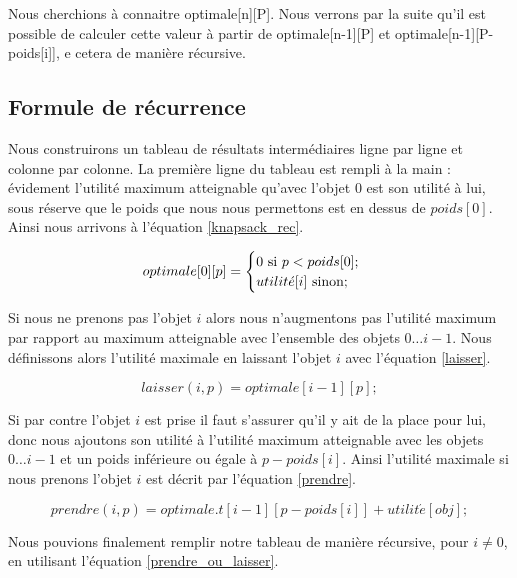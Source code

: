 Nous cherchions à connaitre optimale[n][P]. Nous verrons par la suite qu'il est possible de calculer cette valeur à partir de optimale[n-1][P] et optimale[n-1][P-poids[i]], e cetera de manière récursive.

\subsection{Formule de récurrence}
Nous construirons un tableau de résultats intermédiaires ligne par ligne et colonne par colonne. La première ligne du tableau est rempli à la main : évidement l'utilité maximum atteignable qu'avec l'objet $0$ est son utilité à lui, sous réserve que le poids que nous nous permettons est en dessus de $poids[0]$. Ainsi nous arrivons à l'équation \ref{knapsack_rec}.

\begin{equation}
\label{knapsack_rec}
optimale[0][p] =
	\begin{cases}
		0 \text{ si } p < poids[0];	\\
		utilit\acute{e}[i] \text{ sinon};
	\end{cases} \\
\end{equation}

Si nous ne prenons pas l'objet $i$ alors nous n'augmentons pas l'utilité maximum par rapport au maximum atteignable avec l'ensemble des objets $0 \dots i-1$. Nous définissons alors l'utilité maximale en laissant l'objet $i$ avec l'équation \ref{laisser}.

\begin{equation}
\label{laisser}
laisser(i, p) = optimale[i-1][p];
\end{equation}


Si par contre l'objet $i$ est prise il faut s'assurer qu'il y ait de la place pour lui, donc nous ajoutons son utilité à l'utilité maximum atteignable avec les objets $0 \dots i-1$ et un poids inférieure ou égale à $p-poids[i]$. Ainsi l'utilité maximale si nous prenons l'objet $i$ est décrit par l'équation \ref{prendre}.

\begin{equation}
\label{prendre}
prendre(i, p) = optimale.t[i-1][p - poids[i]] + utilit\acute{e}[obj];
\end{equation}

Nous pouvions finalement remplir notre tableau de manière récursive, pour $i \neq 0$, en utilisant l'équation \ref{prendre_ou_laisser}.

